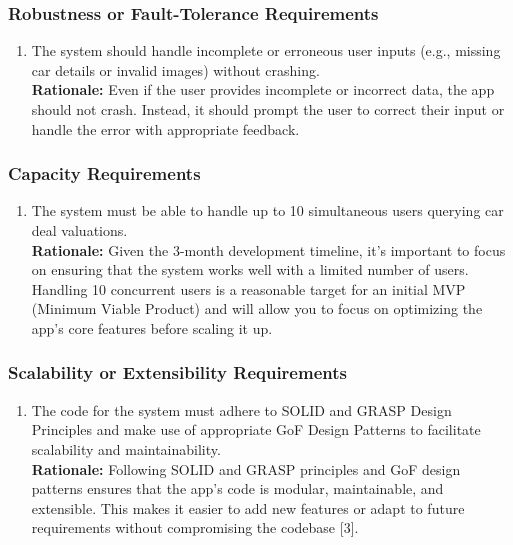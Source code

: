 \documentclass[]{article}
\begin{document}
\begin{enumerate}
\subsubsection{Robustness or Fault-Tolerance Requirements}
\label{ssub:robustness_or_fault_tolerance_requirements}
\begin{enumerate}[{PR-RFT}1.]
    \item The system should handle incomplete or erroneous user inputs (e.g., missing car details or invalid images) without crashing.  \\
    \textbf{Rationale:} Even if the user provides incomplete or incorrect data, the app should not crash. Instead, it should prompt the user to correct their input or handle the error with appropriate feedback.
\end{enumerate}

\subsubsection{Capacity Requirements}
\label{ssub:capacity_requirements}
\begin{enumerate}[{PR-C}1.]
    \item The system must be able to handle up to 10 simultaneous users querying car deal valuations.  \\
    \textbf{Rationale:} Given the 3-month development timeline, it's important to focus on ensuring that the system works well with a limited number of users. Handling 10 concurrent users is a reasonable target for an initial MVP (Minimum Viable Product) and will allow you to focus on optimizing the app's core features before scaling it up.
\end{enumerate}

\subsubsection{Scalability or Extensibility Requirements}
\label{ssub:scalability_or_extensibility_requirements}
\begin{enumerate}[{PR-SE}1.]
    \item The code for the system must adhere to SOLID and GRASP Design Principles and make use of appropriate GoF Design Patterns to facilitate scalability and maintainability.  \\
    \textbf{Rationale:} Following SOLID and GRASP principles and GoF design patterns ensures that the app's code is modular, maintainable, and extensible. This makes it easier to add new features or adapt to future requirements without compromising the codebase [3].
\end{enumerate}


\end{enumerate}
\end{document}
